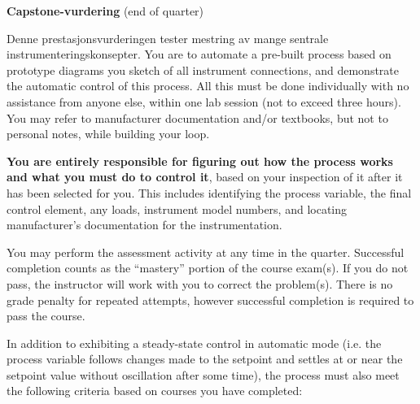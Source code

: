 

\noindent
{\bf Capstone-vurdering} (end of quarter)

\vskip 10pt

Denne prestasjonsvurderingen tester mestring av mange sentrale instrumenteringskonsepter.  You are to automate a pre-built process based on prototype diagrams you sketch of all instrument connections, and demonstrate the automatic control of this process.  All this must be done individually with no assistance from anyone else, within one lab session (not to exceed three hours).  You may refer to manufacturer documentation and/or textbooks, but not to personal notes, while building your loop. 

\vskip 10pt

{\bf You are entirely responsible for figuring out how the process works and what you must do to control it}, based on your inspection of it after it has been selected for you.  This includes identifying the process variable, the final control element, any loads, instrument model numbers, and locating manufacturer's documentation for the instrumentation.

\vskip 10pt

You may perform the assessment activity at any time in the quarter.  Successful completion counts as the ``mastery'' portion of the course exam(s).  If you do not pass, the instructor will work with you to correct the problem(s).  There is no grade penalty for repeated attempts, however successful completion is required to pass the course.

\vskip 10pt

In addition to exhibiting a steady-state control in automatic mode (i.e. the process variable follows changes made to the setpoint and settles at or near the setpoint value without oscillation after some time), the process must also meet the following criteria based on courses you have completed:

